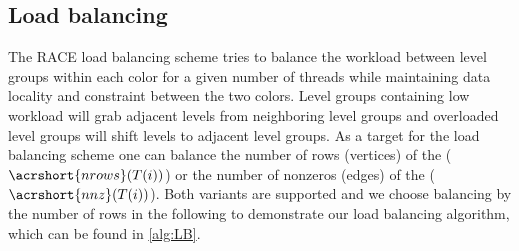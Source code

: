  \subsection{Load balancing}\label{subsec:LB} 
The RACE load balancing scheme tries to balance the workload between level groups within each color for a given number of threads while maintaining data locality and \DK constraint between the two colors. Level groups containing low workload will grab adjacent levels from neighboring level groups and overloaded level groups will shift levels to adjacent level groups. As a target for the load balancing scheme one can balance the number of rows (\ie vertices) of the \levelGroups ($\acrshort{nrows}(T(i))$)  or the number of nonzeros (\ie edges) of the \levelGroups ($\acrshort{nnz}(T(i))$). Both variants are supported and we choose balancing by the number of rows in the following to demonstrate our load balancing algorithm, which can be found in \cref{alg:LB}.
 
